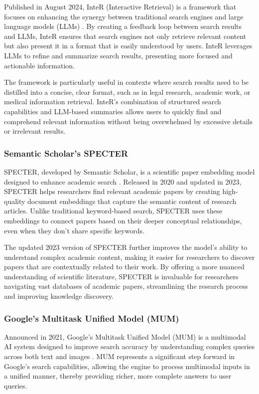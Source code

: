 Published in August 2024, InteR (Interactive Retrieval) is a framework that focuses on enhancing the synergy between traditional search engines and large language models (LLMs) \cite{InteR}. 
By creating a feedback loop between search results and LLMs, InteR ensures that search engines not only retrieve relevant content but also present it in a format that is easily understood by users. 
InteR leverages LLMs to refine and summarize search results, presenting more focused and actionable information.

The framework is particularly useful in contexts where search results need to be distilled into a concise, clear format, such as in legal research, academic work, or medical information retrieval. 
InteR's combination of structured search capabilities and LLM-based summaries allows users to quickly find and comprehend relevant information without being overwhelmed by excessive details or irrelevant results.

\subsubsection{Semantic Scholar's SPECTER}

SPECTER, developed by Semantic Scholar, is a scientific paper embedding model designed to enhance academic search \cite{SPECTER}. 
Released in 2020 and updated in 2023, SPECTER helps researchers find relevant academic papers by creating high-quality document embeddings that capture the semantic content of research articles. 
Unlike traditional keyword-based search, SPECTER uses these embeddings to connect papers based on their deeper conceptual relationships, even when they don't share specific keywords.

The updated 2023 version of SPECTER further improves the model's ability to understand complex academic content, making it easier for researchers to discover papers that are contextually related to their work. 
By offering a more nuanced understanding of scientific literature, SPECTER is invaluable for researchers navigating vast databases of academic papers, streamlining the research process and improving knowledge discovery.

\subsubsection{Google's Multitask Unified Model (MUM)}

Announced in 2021, Google's Multitask Unified Model (MUM) is a multimodal AI system designed to improve search accuracy by understanding complex queries across both text and images \cite{GoogleMUM}. 
MUM represents a significant step forward in Google's search capabilities, allowing the engine to process multimodal inputs in a unified manner, thereby providing richer, more complete answers to user queries.

